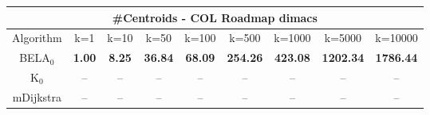 \begin{tabular}{c|cccccccc}\toprule
\multicolumn{9}{c}{#Centroids - COL Roadmap dimacs}\\ \midrule
Algorithm & k=1 & k=10 & k=50 & k=100 & k=500 & k=1000 & k=5000 & k=10000 \\ \midrule
BELA$_0$ & \textbf{1.00} & \textbf{8.25} & \textbf{36.84} & \textbf{68.09} & \textbf{254.26} & \textbf{423.08} & \textbf{1202.34} & \textbf{1786.44} \\
K$_0$ & -- & -- & -- & -- & -- & -- & -- & -- \\
mDijkstra & -- & -- & -- & -- & -- & -- & -- & -- \\ \bottomrule 
\end{tabular}
